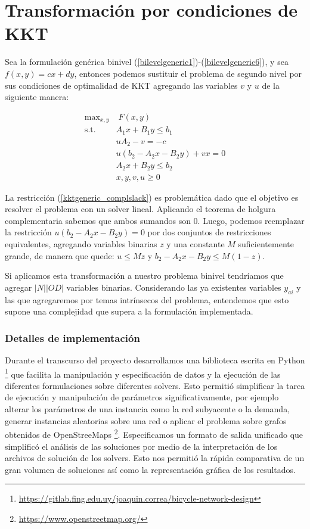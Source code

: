 \chapter{Transformación por condiciones de KKT}
\label{sec:kkttransform}

Sea la formulación genérica binivel (\ref{bilevelgeneric1})-(\ref{bilevelgeneric6}), y sea $f(x, y) = cx + dy$, entonces podemos sustituir el problema de segundo nivel por sus condiciones de optimalidad de KKT agregando las variables $v$ y $u$ de la siguiente manera:

\begin{align}
\text{max}_{x,y}        & \; F(x, y) \label{kktgeneric1} \\
\text{s.t.}             & A_1 x + B_1 y \leq b_1 \\
                        & uA_2 - v = -c \\
                        & u(b_2 - A_2x - B_2y) + vx = 0 \label{kktgeneric_complslack} \\
                        & A_2 x + B_2 y \leq b_2 \label{kktgeneric5} \\
                        & x, y, v, u \geq 0 \label{kktgeneric6}
\end{align}

La restricción (\ref{kktgeneric_complslack}) es problemática dado que el objetivo es resolver el problema con un solver lineal. Aplicando el teorema de holgura complementaria sabemos que ambos sumandos son 0. Luego, podemos reemplazar la restricción $u(b_2 - A_2x - B_2y) = 0$ por dos conjuntos de restricciones equivalentes, agregando variables binarias $z$ y una constante $M$ suficientemente grande, de manera que quede: $u \leq Mz$ y $b_2 - A_2x - B_2y \leq M(1-z)$.

Si aplicamos esta transformación a nuestro problema binivel tendríamos que agregar $|N| |OD|$ variables binarias. Considerando las ya existentes variables $y_{ai}$ y las que agregaremos por temas intrínsecos del problema, entendemos que esto supone una complejidad que supera a la formulación implementada.

\subsection{Detalles de implementación}

Durante el transcurso del proyecto desarrollamos una biblioteca escrita en Python \footnote{\url{https://gitlab.fing.edu.uy/joaquin.correa/bicycle-network-design}} que facilita la manipulación y especificación de datos y la ejecución de las diferentes formulaciones sobre diferentes solvers. Esto permitió simplificar la tarea de ejecución y manipulación de parámetros significativamente, por ejemplo alterar los parámetros de una instancia como la red subyacente o la demanda, generar instancias aleatorias sobre una red o aplicar el problema sobre grafos obtenidos de OpenStreeMaps \footnote{\url{https://www.openstreetmap.org/}}. Especificamos un formato de salida unificado que simplificó el análisis de las soluciones por medio de la interpretación de los archivos de solución de los solvers. Esto nos permitió la rápida comparativa de un gran volumen de soluciones así como la representación gráfica de los resultados.

